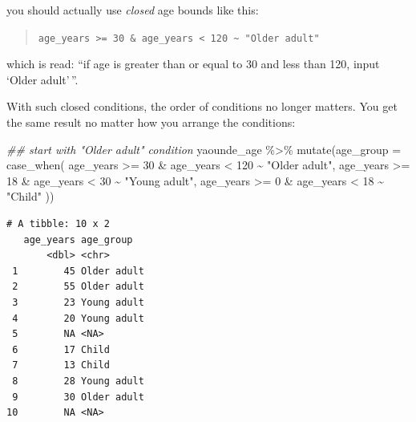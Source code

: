 \documentclass[
  letterpaper,
  DIV=11,
  numbers=noendperiod]{scrreprt}
\newenvironment{Shaded}{\begin{snugshade}}{\end{snugshade}}
\newcommand{\AttributeTok}[1]{\textcolor[rgb]{0.40,0.45,0.13}{#1}}
\newcommand{\DecValTok}[1]{\textcolor[rgb]{0.68,0.00,0.00}{#1}}
\newcommand{\DocumentationTok}[1]{\textcolor[rgb]{0.37,0.37,0.37}{\textit{#1}}}
\newcommand{\FunctionTok}[1]{\textcolor[rgb]{0.28,0.35,0.67}{#1}}
\newcommand{\NormalTok}[1]{\textcolor[rgb]{0.00,0.23,0.31}{#1}}
\newcommand{\SpecialCharTok}[1]{\textcolor[rgb]{0.37,0.37,0.37}{#1}}
\newcommand{\StringTok}[1]{\textcolor[rgb]{0.13,0.47,0.30}{#1}}
\begin{document}
you should actually use \emph{closed} age bounds like this:

\begin{quote}
\texttt{age\_years\ \textgreater{}=\ 30\ \&\ age\_years\ \textless{}\ 120\ \textasciitilde{}\ "Older\ adult"}
\end{quote}

which is read: ``if age is greater than or equal to 30 and less than
120, input `Older adult'\,''.

With such closed conditions, the order of conditions no longer matters.
You get the same result no matter how you arrange the conditions:

\begin{Shaded}
\begin{Highlighting}[]
\DocumentationTok{\#\# start with "Older adult" condition}
\NormalTok{yaounde\_age }\SpecialCharTok{\%\textgreater{}\%}
  \FunctionTok{mutate}\NormalTok{(}\AttributeTok{age\_group =} \FunctionTok{case\_when}\NormalTok{(}
\NormalTok{    age\_years }\SpecialCharTok{\textgreater{}=} \DecValTok{30} \SpecialCharTok{\&}\NormalTok{ age\_years }\SpecialCharTok{\textless{}} \DecValTok{120} \SpecialCharTok{\textasciitilde{}} \StringTok{"Older adult"}\NormalTok{,}
\NormalTok{    age\_years }\SpecialCharTok{\textgreater{}=} \DecValTok{18} \SpecialCharTok{\&}\NormalTok{ age\_years }\SpecialCharTok{\textless{}} \DecValTok{30} \SpecialCharTok{\textasciitilde{}} \StringTok{"Young adult"}\NormalTok{,}
\NormalTok{    age\_years }\SpecialCharTok{\textgreater{}=} \DecValTok{0} \SpecialCharTok{\&}\NormalTok{ age\_years }\SpecialCharTok{\textless{}} \DecValTok{18} \SpecialCharTok{\textasciitilde{}} \StringTok{"Child"}
\NormalTok{  ))}
\end{Highlighting}
\end{Shaded}

\begin{verbatim}
# A tibble: 10 x 2
   age_years age_group  
       <dbl> <chr>      
 1        45 Older adult
 2        55 Older adult
 3        23 Young adult
 4        20 Young adult
 5        NA <NA>       
 6        17 Child      
 7        13 Child      
 8        28 Young adult
 9        30 Older adult
10        NA <NA>       
\end{verbatim}
\end{document}
